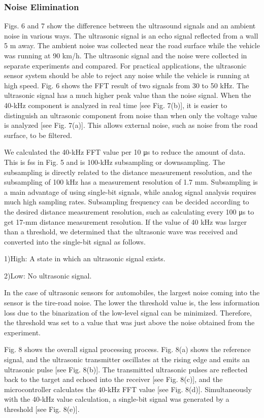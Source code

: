 \subsubsection{Noise Elimination}
Figs. 6 and 7 show the difference between the ultrasound signals and an ambient noise in various ways. The ultrasonic signal is an echo signal reflected from a wall 5 m away. The ambient noise was collected near the road surface while the vehicle was running at 90 km/h. The ultrasonic signal and the noise were collected in separate experiments and compared. For practical applications, the ultrasonic sensor system should be able to reject any noise while the vehicle is running at high speed.
Fig. 6 shows the FFT result of two signals from 30 to 50 kHz. The ultrasonic signal has a much higher peak value than the noise signal. When the 40-kHz component is analyzed in real time [see Fig. 7(b)], it is easier to distinguish an ultrasonic component from noise than when only the voltage value is analyzed [see Fig. 7(a)]. This allows external noise, such as noise from the road surface, to be filtered.

We calculated the 40-kHz FFT value per 10 μs to reduce the amount of data. This is fss in Fig. 5 and is 100-kHz subsampling or downsampling. The subsampling is directly related to the distance measurement resolution, and the subsampling of 100 kHz has a measurement resolution of 1.7 mm. Subsampling is a main advantage of using single-bit signals, while analog signal analysis requires much high sampling rates. Subsampling frequency can be decided according to the desired distance measurement resolution, such as calculating every 100 μs to get 17-mm distance measurement resolution.
If the value of 40 kHz was larger than a threshold, we determined that the ultrasonic wave was received and converted into the single-bit signal as follows.

1)High: A state in which an ultrasonic signal exists.

2)Low: No ultrasonic signal.

In the case of ultrasonic sensors for automobiles, the largest noise coming into the sensor is the tire-road noise. The lower the threshold value is, the less information loss due to the binarization of the low-level signal can be minimized. Therefore, the threshold was set to a value that was just above the noise obtained from the experiment.

Fig. 8 shows the overall signal processing process. Fig. 8(a) shows the reference signal, and the ultrasonic transmitter oscillates at the rising edge and emits an ultrasonic pulse [see Fig. 8(b)]. The transmitted ultrasonic pulses are reflected back to the target and echoed into the receiver [see Fig. 8(c)], and the microcontroller calculates the 40-kHz FFT value [see Fig. 8(d)]. Simultaneously with the 40-kHz value calculation, a single-bit signal was generated by a threshold [see Fig. 8(e)].

